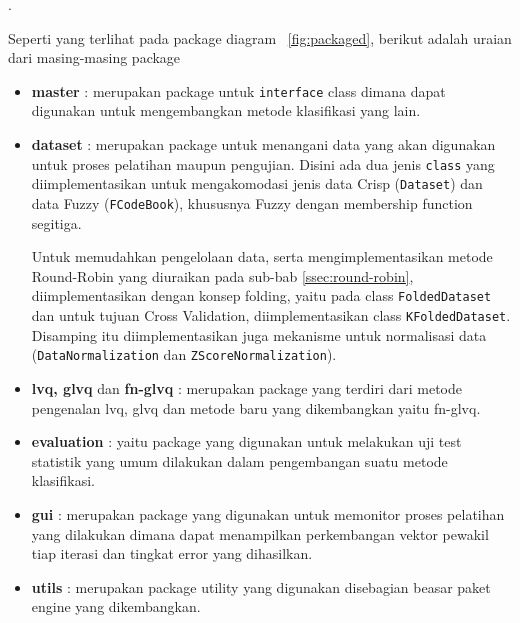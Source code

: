 .

\noindent Seperti yang terlihat pada package diagram \pic~\ref{fig:packaged},
berikut adalah uraian dari masing-masing package
\begin{itemize}
  \item \textbf{master} : merupakan package untuk \texttt{interface} class
  dimana dapat digunakan untuk mengembangkan metode klasifikasi yang lain.
  
  \item \textbf{dataset} : merupakan package untuk menangani data yang akan
  digunakan untuk proses pelatihan maupun pengujian. Disini ada dua jenis
  \texttt{class} yang diimplementasikan untuk mengakomodasi jenis data Crisp
  (\texttt{Dataset}) dan data Fuzzy (\texttt{FCodeBook}), khususnya Fuzzy dengan
  membership function segitiga. \\ 
  
	
  Untuk memudahkan pengelolaan data, serta mengimplementasikan metode
  Round-Robin yang diuraikan pada sub-bab \ref{ssec:round-robin},
  diimplementasikan dengan konsep folding, yaitu pada class
  \texttt{FoldedDataset} dan untuk tujuan Cross Validation, diimplementasikan
  class \texttt{KFoldedDataset}. Disamping itu diimplementasikan juga mekanisme
  untuk normalisasi data (\texttt{DataNormalization}  dan
  \texttt{ZScoreNormalization}).
  
  \item \textbf{lvq, glvq} dan \textbf{fn-glvq} : merupakan package yang
  terdiri dari metode pengenalan lvq, glvq dan metode baru yang dikembangkan
  yaitu fn-glvq.
  
  \item \textbf{evaluation} : yaitu package yang digunakan untuk melakukan uji
  test statistik yang umum dilakukan dalam pengembangan suatu metode klasifikasi.
  
  \item \textbf{gui} : merupakan package yang digunakan untuk memonitor proses
  pelatihan yang dilakukan dimana dapat menampilkan perkembangan vektor pewakil
  tiap iterasi dan tingkat error yang dihasilkan.
  
  \item \textbf{utils} : merupakan package utility yang digunakan disebagian
  beasar paket engine yang dikembangkan.
\end{itemize} 

